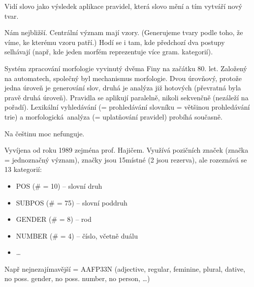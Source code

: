\documentclass[12pt]{article}					%
\begin{document}
\begin{definice}
	Vidí slovo jako výsledek aplikace pravidel, která slovo mění a tím vytváří nový tvar.
\end{definice}

\begin{definice}
	Nám nejbližší. Centrální význam mají vzory. (Generujeme tvary podle toho, že víme, ke kterému vzoru patří.) Hodí se i tam, kde předchozí dva postupy selhávají (např, kde jeden morfém reprezentuje více gram. kategorií).
\end{definice}

\begin{definice}
	Systém zpracování morfologie vyvinutý dvěma Finy na začátku 80. let. Založený na automatech, společný byl mechanismus morfologie. Dvou úrovňový, protože jedna úroveň je generování slov, druhá je analýza již hotových (převratná byla pravě druhá úroveň). Pravidla se aplikují paralelně, nikoli sekvenčně (nezáleží na pořadí). Lexikální vyhledávání (= prohledávání slovníku = většinou prohledávání trie) a morfologická analýza (= uplatňování pravidel) probíhá současně.

	Na češtinu moc nefunguje. 
\end{definice}

\begin{definice}
	Vyvíjena od roku 1989 zejména prof. Hajičem. Využívá pozičních značek (značka = jednoznačný význam), značky jsou 15místné (2 jsou rezerva), ale rozeznává se 13 kategorií:
	\begin{itemize}
		\item POS (\# = 10) – slovní druh
		\item SUBPOS (\# = 75) – slovní poddruh
		\item GENDER (\# = 8) – rod
		\item NUMBER (\# = 4) – číslo, včetně duálu
		\item …
	\end{itemize}

	Např nejnezajímavější = AAFP3\-\-\-\-3N\-\-\-\- (adjective, regular, feminine, plural, dative, no poss. gender, no poss. number, no person, …)
\end{definice}
\end{document}
